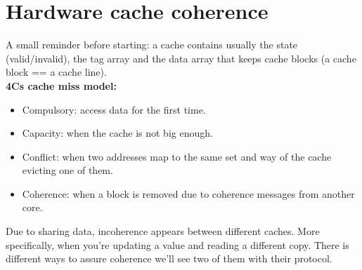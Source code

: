 \section{Hardware cache coherence}
    \begin{tcolorbox}[violet]
        A small reminder before starting: a cache contains usually the state (valid/invalid), the tag array and the data array that keeps cache blocks (a cache block == a cache line). \\
        \textbf{4Cs cache miss model:}
        \begin{itemize}[left=10pt, label=\textbullet]
            \item Compulsory: access data for the first time.
            \item Capacity: when the cache is not big enough.
            \item Conflict: when two addresses map to the same set and way of the cache evicting one of them. 
            \item Coherence: when a block is removed due to coherence messages from another core.
        \end{itemize}
    \end{tcolorbox}
    Due to sharing data, incoherence appears between different caches. More specifically, when you're updating a value and reading a different copy. There is different ways to assure coherence we'll see two of them with their protocol.\\
